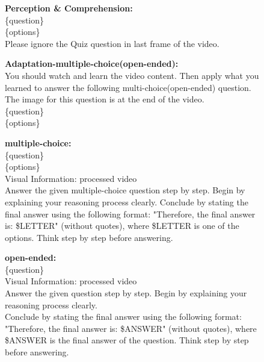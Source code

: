 \begin{figure}[h]
\begin{tcolorbox}[colback=black!7.5!white, colframe=black!80!white, title=VideoMMMU -- For other models, fontupper=\footnotesize, fontlower=\footnotesize, fonttitle=\footnotesize]

\textbf{Perception \& Comprehension:}\\
\{question\}\\
\{options\}\\
Please ignore the Quiz question in last frame of the video.

\tcblower
\textbf{Adaptation-multiple-choice(open-ended):}\\
You should watch and learn the video content. Then apply what you learned to answer the
following multi-choice(open-ended) question. The image for this question is at the end of the video.\\
\{question\}\\
\{options\}
\end{tcolorbox}
\end{figure}

\begin{figure}[h]
\begin{tcolorbox}[colback=black!7.5!white, colframe=black!80!white, title={MMVU -- For Qwen series models and InternVL3.5-8B}, fontupper=\footnotesize, fontlower=\footnotesize, fonttitle=\footnotesize]

\textbf{multiple-choice:}\\
\{question\}\\
\{options\}\\
Visual Information: processed video\\
Answer the given multiple-choice question step by step. Begin by explaining your
reasoning process clearly. Conclude by stating the final answer using the following
format: "Therefore, the final answer is: \$LETTER" (without quotes), where \$LETTER is one of the options. Think step by step before answering.

\tcblower
\textbf{open-ended:}\\
\{question\}\\
Visual Information: processed video\\
Answer the given question step by step. Begin by explaining your reasoning process
clearly.\\
Conclude by stating the final answer using the following format: "Therefore, the final answer is: \$ANSWER" (without quotes), where \$ANSWER is the final answer of the question. Think step by step before answering.

\end{tcolorbox}
\end{figure}


